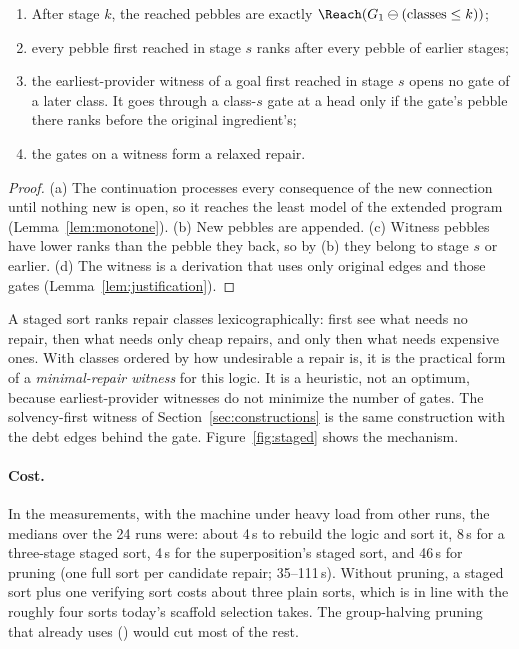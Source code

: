 \begin{proposition}\label{prop:staged}
\leavevmode
\begin{enumerate}[nosep,label=(\alph*)]
\item After stage $k$, the reached pebbles are exactly $\Reach(G_1\ominus(\text{classes}\le k))$;
\item every pebble first reached in stage $s$ ranks after every pebble of earlier stages;
\item the earliest-provider witness of a goal first reached in stage $s$ opens no gate of a later class. It goes through a class-$s$ gate at a head only if the gate's pebble there ranks before the original ingredient's;
\item the gates on a witness form a relaxed repair.
\end{enumerate}
\end{proposition}
\begin{proof}
(a) The continuation processes every consequence of the new connection until nothing new is open, so it reaches the least model of the extended program (Lemma~\ref{lem:monotone}). (b) New pebbles are appended. (c) Witness pebbles have lower ranks than the pebble they back, so by (b) they belong to stage $s$ or earlier. (d) The witness is a derivation that uses only original edges and those gates (Lemma~\ref{lem:justification}).
\end{proof}

A staged sort ranks repair classes lexicographically: first see what needs no repair, then what needs only cheap repairs, and only then what needs expensive ones. With classes ordered by how undesirable a repair is, it is the practical form of a \emph{minimal-repair witness} for this logic. It is a heuristic, not an optimum, because earliest-provider witnesses do not minimize the number of gates. The solvency-first witness of Section~\ref{sec:constructions} is the same construction with the debt edges behind the gate. Figure~\ref{fig:staged} shows the mechanism.

\paragraph{Cost.} In the measurements, with the machine under heavy load from other runs, the medians over the 24 runs were: about 4\,s to rebuild the logic and sort it, 8\,s for a three-stage staged sort, 4\,s for the superposition's staged sort, and 46\,s for pruning (one full sort per candidate repair; 35--111\,s). Without pruning, a staged sort plus one verifying sort costs about three plain sorts, which is in line with the roughly four sorts today's scaffold selection takes. The group-halving pruning that  already uses () would cut most of the rest.

